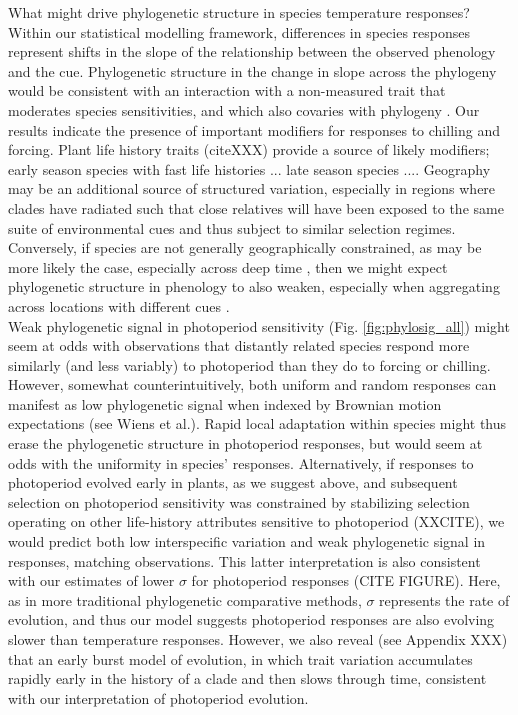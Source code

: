 \documentclass{article}\usepackage[]{graphicx}\usepackage[]{color}
\begin{document}
What might drive phylogenetic structure in species temperature responses? Within our statistical modelling framework, differences in species responses represent shifts in the slope of the relationship between the observed phenology and the cue. Phylogenetic structure in the change in slope across the phylogeny would be consistent with an interaction with a non-measured trait that moderates species sensitivities, and which also covaries with phylogeny \citep{davies2019phylogenetically}. Our results indicate the presence of important modifiers for responses to chilling and forcing. Plant life history traits (citeXXX) provide a source of likely modifiers; early season species with fast life histories ... late season species .... Geography may be an additional source of structured variation, especially in regions where clades have radiated such that close relatives will have been exposed to the same suite of environmental cues and thus subject to similar selection regimes. Conversely, if species are not generally geographically constrained, as may be more likely the case, especially across deep time \citep{fitzturelli2006}, then we might expect phylogenetic structure in phenology to also weaken, especially when aggregating across locations with different cues \citep{davies2013phylogenetic}.
\\

Weak phylogenetic signal in photoperiod sensitivity (Fig. \ref{fig:phylosig_all}) might seem at odds with observations that distantly related species respond more similarly (and less variably) to photoperiod than they do to forcing or chilling. However, somewhat counterintuitively, both uniform and random responses can manifest as low phylogenetic signal when indexed by Brownian motion expectations (see Wiens et al.). Rapid local adaptation within species might thus erase the phylogenetic structure in photoperiod responses, but would seem at odds with the uniformity in species' responses. Alternatively, if responses to photoperiod evolved early in plants, as we suggest above, and subsequent selection on photoperiod sensitivity was constrained by stabilizing selection operating on other life-history attributes sensitive to photoperiod (XXCITE), we would predict both low interspecific variation and weak phylogenetic signal in responses, matching observations. This latter interpretation is also consistent with our estimates of lower $\sigma$ for photoperiod responses (CITE FIGURE). Here, as in more traditional phylogenetic comparative methods, $\sigma$ represents the rate of evolution, and thus our model suggests photoperiod responses are also evolving slower than temperature responses. However, we also reveal (see Appendix XXX) that an early burst model of evolution, in which trait variation accumulates rapidly early in the history of a clade and then slows through time, consistent with our interpretation of photoperiod evolution.
\\
\end{document}
